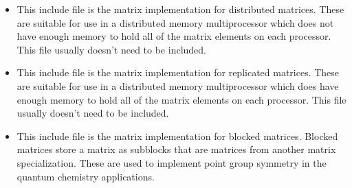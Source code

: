 \begin{itemize}
\item[\filnm{dist.h}]
This include file is the matrix implementation for distributed matrices.
These are suitable for use in a distributed memory multiprocessor which
does not have enough memory to hold all of the matrix elements on each
processor.  This file usually doesn't need to be included.

\item[\filnm{repl.h}]
This include file is the matrix implementation for replicated matrices.
These are suitable for use in a distributed memory multiprocessor which
does have enough memory to hold all of the matrix elements on each
processor.  This file usually doesn't need to be included.

\item[\filnm{blocked.h}]
This include file is the matrix implementation for blocked matrices.
Blocked matrices store a matrix as subblocks that are matrices from
another matrix specialization.  These are used to implement point group
symmetry in the quantum chemistry applications.

\end{itemize}















